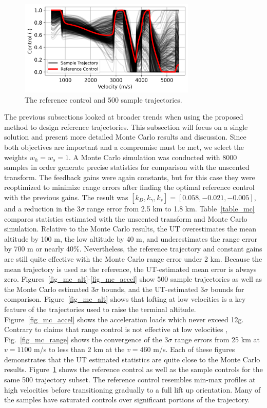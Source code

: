 \documentclass[journal ]{new-aiaa}
\begin{document}
\begin{figure}[h!]
	\centering
	\includegraphics[width=0.75\textwidth]{ddp/python/Control}
	\caption{The reference control and 500 sample trajectories.}
	\label{fig_mc_control}
\end{figure}
The previous subsections looked at broader trends when using the proposed method to design reference trajectories. This subsection will focus on a single solution and present more detailed Monte Carlo results and discussion. Since both objectives are important and a compromise must be met, we select the weights $w_h=w_s=1$. A Monte Carlo simulation was conducted with 8000 samples in order generate precise statistics for comparison with the unscented transform. The feedback gains were again constants, but for this case they were reoptimized to minimize range errors after finding the optimal reference control with the previous gains. The result was $[k_D, k_{\gamma}, k_s] = [0.058, -0.021, -0.005]$, and a reduction in the 3$\sigma$ range error from 2.5 km to 1.8 km.
Table~\ref{table_mc} compares statistics estimated with the unscented transform and Monte Carlo simulation. Relative to the Monte Carlo results, the UT overestimates the mean altitude by 100 m, the low altitude by 40 m, and underestimates the range error by 700 m or nearly 40\%. Nevertheless, the reference trajectory and constant gains are still quite effective with the Monte Carlo range error under 2 km. Because the mean trajectory is used as the reference, the UT-estimated mean error is always zero. 
Figures~\ref{fig_mc_alt}-\ref{fig_mc_accel} show 500 sample trajectories as well as the Monte Carlo estimated 3$\sigma$ bounds, and the UT-estimated 3$\sigma$ bounds for comparison. Figure~\ref{fig_mc_alt} shows that lofting at low velocities is a key feature of the trajectories used to raise the terminal altitude. Figure~\ref{fig_mc_accel} shows the acceleration loads which never exceed 12g.
Contrary to claims that range control is not effective at low velocities \cite{MSL_EDL2}, Fig.~\ref{fig_mc_range} shows the convergence of the 3$\sigma$ range errors from 25 km at $ v=1100 $ m/s to less than 2 km at the $v=460$ m/s. Each of these figures demonstrates that the UT estimated statistics are quite close to the Monte Carlo results. Figure~\ref{fig_mc_control} shows the reference control as well as the sample controls for the same 500 trajectory subset. The reference control resembles min-max profiles at high velocities before transitioning gradually to a full lift up orientation. Many of the samples have saturated controls over significant portions of the trajectory.  
\end{document}
